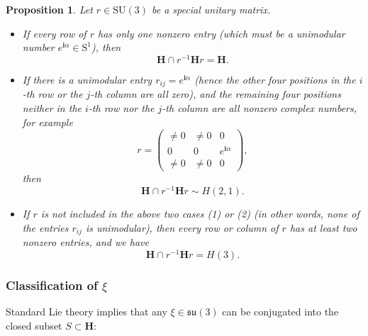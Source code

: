 \documentclass[12pt]{amsart}
\newtheorem{proposition}[theorem]{Proposition}
\theoremstyle{definition}
\numberwithin{equation}{section}
\newcommand{\Sone}{\mathrm{S}^1}
\newcommand{\imagunit}{\mathbf{i}}
\newcommand{\SU}{\mathrm{SU}}
\newcommand{\su}{\mathfrak{su}}
\newcommand{\Cartan}{\mathbf{H}}
\begin{document}
\begin{proposition}\label{Prop:typeII}
    Let $r\in \SU(3)$ be a special unitary   matrix. 
     \begin{itemize}
     \item[(1)]
     If every row of $r$ has only one nonzero entry (which must be a unimodular number $e^{\imagunit  \alpha}\in \Sone$), then
     $$
     \Cartan \cap r^{-1} \Cartan r= \Cartan.
     $$    
     \item[(2)]If there is a unimodular entry $r_{ij}=e^{\imagunit  \alpha}$  (hence the other four positions in the $i$-th row or the $j$-th column are all zero), and the remaining four positions neither in the $i$-th row nor the $j$-th column are all nonzero complex numbers, for example
         $$
         r=\begin{pmatrix}
     	\neq 0     		&   \neq 0				 &   0  \\
     	0	    &  0    &   e^{\imagunit \alpha}  \\
   \neq  	0					 					    &  		\neq 0								 & 0
     \end{pmatrix},
         $$
                  then 
                  $$
     \Cartan \cap r^{-1} \Cartan r\sim H(2,1).
     $$ 
     \item[(3)] If $r$ is not included in the above two cases (1) or (2) (in other words, none of the entries $r_{ij}$ is unimodular), then every row or column of $r$ has at least two nonzero entries, and we have $$
     \Cartan \cap r^{-1} \Cartan r= H(3).
     $$ 
   \end{itemize}
\end{proposition}

\subsubsection{Classification of $\xi$}


 

 Standard Lie theory implies that any $\xi \in \su(3)$ can be conjugated into the closed subset $S \subset \Cartan$:
   
\end{document}
